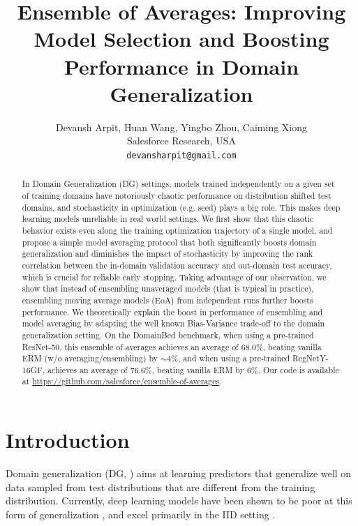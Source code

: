 \documentclass{article}
\title{Ensemble of Averages: Improving Model Selection and Boosting Performance in Domain Generalization}
\author{%
  Devansh Arpit, Huan Wang, Yingbo Zhou, Caiming Xiong\\
  Salesforce Research, USA\\
  \texttt{devansharpit@gmail.com} \\
}
\begin{document}
\maketitle
\begin{abstract}
In Domain Generalization (DG) settings, models trained independently on a given set of training domains have notoriously chaotic performance on distribution shifted test domains, and stochasticity in optimization (e.g. seed) plays a big role. This makes deep learning models unreliable in real world settings. We first show that this chaotic behavior exists even along the training optimization trajectory of a single model, and propose a simple model averaging protocol that both significantly boosts domain generalization and diminishes the impact of stochasticity by improving the rank correlation between the in-domain validation accuracy and out-domain test accuracy, which is crucial for reliable early stopping. Taking advantage of our observation, we show that instead of ensembling unaveraged models (that is typical in practice), ensembling moving average models (EoA) from independent runs further boosts performance. We theoretically explain the boost in performance of ensembling and model averaging by adapting the well known Bias-Variance trade-off to the domain generalization setting. On the DomainBed benchmark, when using a pre-trained ResNet-50, this ensemble of averages achieves an average of $68.0\%$, beating vanilla ERM (w/o averaging/ensembling) by $\sim 4\%$, and when using a pre-trained RegNetY-16GF, achieves an average of $76.6\%$, beating vanilla ERM by $6\%$. Our code is available at \url{https://github.com/salesforce/ensemble-of-averages}.
\end{abstract}

\section{Introduction}

Domain generalization (DG, \cite{blanchard2011generalizing}) aims at learning predictors that generalize well on data sampled from test distributions that are different from the training distribution. Currently, deep learning models have been shown to be poor at this form of generalization \cite{d2020underspecification}, and excel primarily in the IID setting \cite{zhou2021domain}.
\end{document}
